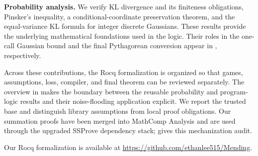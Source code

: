 \textbf{Probability analysis.} We verify KL divergence and its finiteness obligations, Pinsker's inequality, a conditional-coordinate preservation theorem, and the equal-variance KL formula for integer discrete Gaussians.
These results provide the underlying mathematical foundations used in the logic.
Their roles in the one-call Gaussian bound and the final Pythagorean conversion
appear in , respectively.

Across these contributions, the Rocq formalization is organized so that games,
assumptions, loss, compiler, and final theorem can be reviewed separately.
The overview in  makes the boundary between the reusable
probability and program-logic results and their noise-flooding application
explicit. We report the trusted base and distinguish library assumptions
from local proof obligations. Our summation proofs have been merged into
MathComp Analysis and are used through the upgraded SSProve dependency stack;
 gives this mechanization audit.

Our Rocq formalization is available at
\url{https://github.com/ethanlee515/Mending}.
